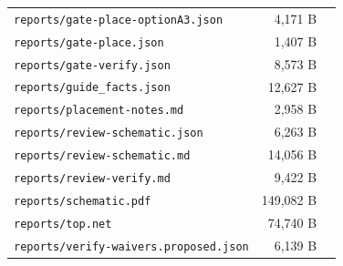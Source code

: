 \documentclass[11pt]{article}
\begin{document}
{\begin{longtable}{p{9cm}rp{4cm}}
\texttt{reports/gate-place-optionA3.json} & 4,171 B &  \\
\texttt{reports/gate-place.json} & 1,407 B &  \\
\texttt{reports/gate-verify.json} & 8,573 B &  \\
\texttt{reports/guide\_facts.json} & 12,627 B &  \\
\texttt{reports/placement-notes.md} & 2,958 B &  \\
\texttt{reports/review-schematic.json} & 6,263 B &  \\
\texttt{reports/review-schematic.md} & 14,056 B &  \\
\texttt{reports/review-verify.md} & 9,422 B &  \\
\texttt{reports/schematic.pdf} & 149,082 B &  \\
\texttt{reports/top.net} & 74,740 B &  \\
\texttt{reports/verify-waivers.proposed.json} & 6,139 B &  \\
\hline
\end{longtable}
}
\end{document}
